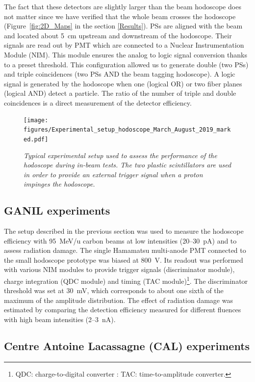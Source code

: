 \documentclass[a4paper,11pt]{article}
\begin{document}
The fact that these detectors are slightly larger than the beam hodoscope does not matter since we have verified that the whole beam crosses the hodoscope (Figure~\ref{fig:2D_Maps} in the section \ref{Results}). PSs are aligned with the beam and located about 5~cm upstream and downstream of the hodoscope. Their signals are read out by PMT which are connected to a Nuclear Instrumentation Module (NIM). This module ensures the analog to logic signal conversion thanks to a preset threshold. This configuration allowed us to generate double (two PSs) and triple coincidences (two PSs AND the beam tagging hodoscope). A logic signal is generated
by the hodoscope when one (logical OR) or two fiber planes (logical AND) detect a particle. The ratio of the number of triple and double coincidences is a direct measurement of the detector efficiency.

\begin{figure}[htb]
\centering
\texttt{[image: figures/Experimental\_setup\_hodoscope\_March\_August\_2019\_marked.pdf]}
\caption{\small{\textit{Typical experimental setup used to assess the performance of the hodoscope during in-beam tests. The two plastic scintillators are used in order to provide an external trigger signal when a proton impinges the hodoscope.}}}
\label{fig:Picture_Setup_hodo}
\end{figure}


\subsection{GANIL experiments}

The setup described in the previous section was used to measure the hodoscope efficiency with  95~MeV/u carbon beams at low intensities (20--30~pA) and to assess radiation damage. The single Hamamatsu multi-anode PMT connected to the small hodoscope prototype was biased at 800~V. Its readout was performed with various NIM modules to provide trigger signals (discriminator module), charge integration (QDC module) and timing (TAC module)\footnote{QDC: charge-to-digital converter : TAC: time-to-amplitude converter.}. The discriminator threshold was set at 30~mV, which corresponds to about one sixth of the maximum of the amplitude distribution. The effect of radiation damage was estimated by comparing the detection efficiency measured for different fluences with high beam intensities (2--3~nA).

\subsection{Centre Antoine Lacassagne (CAL) experiments}
\label{In-beam_tests}
\end{document}
